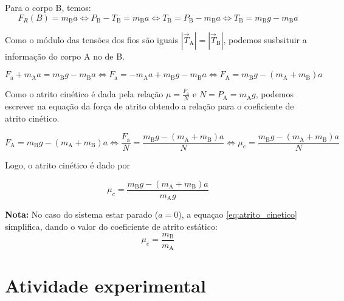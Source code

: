 \documentclass{article}
\begin{document}
	Para o corpo B, temos:
	\[ 
		F_R(B) = m_\text{B} a \Leftrightarrow P_\text{B} - T_\text{B} = m_\text{B} a \Leftrightarrow T_\text{B} =  P_\text{B} - m_\text{B} a \Leftrightarrow T_\text{B} =  m_\text{B} g - m_\text{B} a
	\]
	
	Como o módulo das tensões dos fios são iguais $|\vec{T}_\text{A}|=|\vec{T}_\text{B}|$, podemos susbsituir a informação do corpo A no de B.
	
	\[
		F_\text{a} + m_\text{A} a =  m_\text{B} g - m_\text{B} a \Leftrightarrow F_\text{a} =  - m_\text{A} a + m_\text{B} g - m_\text{B} a \Leftrightarrow F_\text{A} = m_\text{B} g -(m_\text{A}+m_\text{B}) a 
	\]
	
	Como o atrito cinético é dada pela relação $\mu = \frac{F_\text{a}}{N}$ e $N = P_\text{A} = m_\text{A} g $, podemos escrever na equação da força de atrito obtendo a relação para o coeficiente de atrito cinético.
	
	\[
	F_\text{A} = m_\text{B} g -(m_\text{A}+m_\text{B}) a \Leftrightarrow \dfrac{F_\text{a}}{N} = \dfrac{m_\text{B} g -(m_\text{A}+m_\text{B}) a}{N} \Leftrightarrow \mu_e = \dfrac{m_\text{B} g -(m_\text{A}+m_\text{B}) a}{N}
	\]
	
	Logo, o atrito cinético é dado por
	
	\begin{equation}
		\boxed{\mu_c = \dfrac{m_\text{B} g -(m_\text{A}+m_\text{B}) a}{m_\text{A} g}}
		\label{eq:atrito_cinetico}
	\end{equation}
	
	\textbf{Nota:} No caso do sistema estar parado ($a = 0$), a equaçao \ref{eq:atrito_cinetico} simplifica, dando o valor do coeficiente de atrito estático:\\
	\begin{equation}
		\mu_e = \dfrac{m_\text{B}}{m_\text{A}}
		\label{eq:atrito_estat2}
	\end{equation}
	
	
	\section{Atividade experimental}
	
\end{document}
